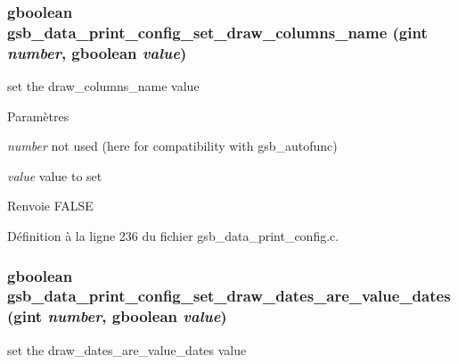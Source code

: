 \subsubsection[{gsb\_\-data\_\-print\_\-config\_\-set\_\-draw\_\-columns\_\-name}]{\setlength{\rightskip}{0pt plus 5cm}gboolean gsb\_\-data\_\-print\_\-config\_\-set\_\-draw\_\-columns\_\-name (gint {\em number}, \/  gboolean {\em value})}\label{gsb__data__print__config_8c_a59f35cc5d8bddd66c4c302f32820b4b9}
set the draw\_\-columns\_\-name value


\begin{DoxyParams}{Paramètres}
\item[{\em number}]not used (here for compatibility with gsb\_\-autofunc) \item[{\em value}]value to set\end{DoxyParams}
\begin{DoxyReturn}{Renvoie}
FALSE 
\end{DoxyReturn}


Définition à la ligne 236 du fichier gsb\_\-data\_\-print\_\-config.c.

\subsubsection[{gsb\_\-data\_\-print\_\-config\_\-set\_\-draw\_\-dates\_\-are\_\-value\_\-dates}]{\setlength{\rightskip}{0pt plus 5cm}gboolean gsb\_\-data\_\-print\_\-config\_\-set\_\-draw\_\-dates\_\-are\_\-value\_\-dates (gint {\em number}, \/  gboolean {\em value})}\label{gsb__data__print__config_8c_aaa7ae93d7b50c959a8844a2e6773c7e4}
set the draw\_\-dates\_\-are\_\-value\_\-dates value


